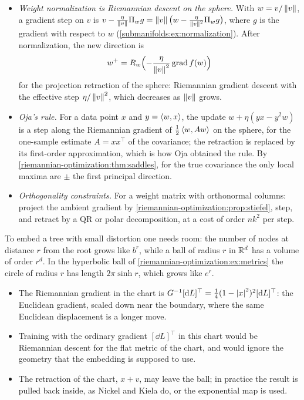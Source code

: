 \begin{notechapter}
\begin{mlthread}
\begin{itemize}[nosep]
  \item \emph{Weight normalization is Riemannian descent on the sphere.}
        With $w = v/\left\|v\right\|$, a gradient step on $v$ is
        $v - \frac\eta{\left\|v\right\|}\Pi_w g = \left\|v\right\|\bigl(w
        - \frac\eta{\left\|v\right\|^2}\Pi_wg\bigr)$, where $g$ is the gradient
        with respect to $w$
        (\cref{submanifolds:ex:normalization}). After normalization, the
        new direction is
        \[
          w^+ = R_w\Bigl(-\frac\eta{\left\|v\right\|^2}\operatorname{grad}f(w)\Bigr)
        \]
        for the projection retraction of the sphere: Riemannian gradient
        descent with the effective step $\eta/\left\|v\right\|^2$, which decreases
        as $\left\|v\right\|$ grows.
  \item \emph{Oja's rule.} For a data point $x$ and $y = \left\langle w, x \right\rangle$, the
        update $w + \eta(yx - y^2w)$ is a step along the Riemannian
        gradient of $\frac12\left\langle w, Aw \right\rangle$ on the sphere, for the
        one-sample estimate $A = xx^\top$ of the covariance; the
        retraction is replaced by its first-order approximation, which
        is how Oja obtained the rule. By
        \cref{riemannian-optimization:thm:saddles}, for the true
        covariance the only local maxima are $\pm$ the first principal
        direction.
  \item \emph{Orthogonality constraints.} For a weight matrix with
        orthonormal columns: project the ambient gradient by
        \cref{riemannian-optimization:prop:stiefel}, step, and retract by
        a QR or polar decomposition, at a cost of order $nk^2$ per step.
\end{itemize}
\end{mlthread}

\begin{mlthread}
To embed a tree with small distortion one needs room: the number of nodes
at distance $r$ from the root grows like $b^r$, while a ball of radius
$r$ in $\mathbb{R}^d$ has a volume of order $r^d$. In the hyperbolic ball of
\cref{riemannian-optimization:ex:metrics} the circle of radius $r$ has
length $2\pi\sinh r$, which grows like $e^r$.
\begin{itemize}[nosep]
  \item The Riemannian gradient in the chart is
        $G^{-1}[\mathrm{d} L]^\top = \frac14(1 - \left|x\right|^2)^2[\mathrm{d} L]^\top$:
        the Euclidean gradient, scaled down near the boundary, where the
        same Euclidean displacement is a longer move.
  \item Training with the ordinary gradient $[\dd L]^\top$ in this chart
        would be Riemannian descent for the flat metric of the chart, and
        would ignore the geometry that the embedding is supposed to use.
  \item The retraction of the chart, $x + v$, may leave the ball; in
        practice the result is pulled back inside, as Nickel and Kiela
        do, or the exponential map is used.
\end{itemize}
\end{mlthread}


\end{notechapter}
